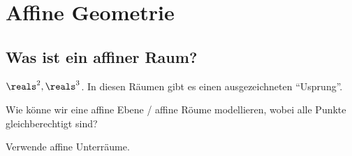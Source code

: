\chapter{Affine Geometrie}
\section{Was ist ein affiner Raum?}
\begin{beispiel}
    \( \reals^2, \reals^3 \). 
    In diesen Räumen gibt es einen ausgezeichneten \enquote{Usprung}.
\end{beispiel}
\begin{frage*}
    Wie könne wir eine affine Ebene / affine Röume modellieren, wobei alle Punkte gleichberechtigt sind?
\end{frage*}
\begin{idee*}
    Verwende affine Unterräume.
\end{idee*}
